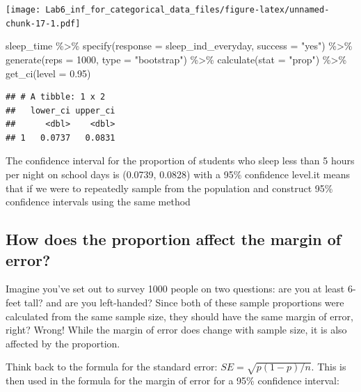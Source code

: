 \documentclass[
]{article}
\newenvironment{Shaded}{\begin{snugshade}}{\end{snugshade}}
\newcommand{\AttributeTok}[1]{\textcolor[rgb]{0.77,0.63,0.00}{#1}}
\newcommand{\DecValTok}[1]{\textcolor[rgb]{0.00,0.00,0.81}{#1}}
\newcommand{\FloatTok}[1]{\textcolor[rgb]{0.00,0.00,0.81}{#1}}
\newcommand{\FunctionTok}[1]{\textcolor[rgb]{0.00,0.00,0.00}{#1}}
\newcommand{\NormalTok}[1]{#1}
\newcommand{\SpecialCharTok}[1]{\textcolor[rgb]{0.00,0.00,0.00}{#1}}
\newcommand{\StringTok}[1]{\textcolor[rgb]{0.31,0.60,0.02}{#1}}
\begin{document}
\texttt{[image: Lab6\_inf\_for\_categorical\_data\_files/figure-latex/unnamed-chunk-17-1.pdf]}

\begin{Shaded}
\begin{Highlighting}[]
\NormalTok{sleep\_time }\SpecialCharTok{\%\textgreater{}\%}
 \FunctionTok{specify}\NormalTok{(}\AttributeTok{response =}\NormalTok{ sleep\_ind\_everyday, }\AttributeTok{success =} \StringTok{"yes"}\NormalTok{) }\SpecialCharTok{\%\textgreater{}\%}
 \FunctionTok{generate}\NormalTok{(}\AttributeTok{reps =} \DecValTok{1000}\NormalTok{, }\AttributeTok{type =} \StringTok{"bootstrap"}\NormalTok{) }\SpecialCharTok{\%\textgreater{}\%}
 \FunctionTok{calculate}\NormalTok{(}\AttributeTok{stat =} \StringTok{"prop"}\NormalTok{) }\SpecialCharTok{\%\textgreater{}\%}
 \FunctionTok{get\_ci}\NormalTok{(}\AttributeTok{level =} \FloatTok{0.95}\NormalTok{)}
\end{Highlighting}
\end{Shaded}

\begin{verbatim}
## # A tibble: 1 x 2
##   lower_ci upper_ci
##      <dbl>    <dbl>
## 1   0.0737   0.0831
\end{verbatim}

The confidence interval for the proportion of students who sleep less
than 5 hours per night on school days is (0.0739, 0.0828) with a 95\%
confidence level.it means that if we were to repeatedly sample from the
population and construct 95\% confidence intervals using the same method

\hypertarget{how-does-the-proportion-affect-the-margin-of-error}{%
\subsection{How does the proportion affect the margin of
error?}\label{how-does-the-proportion-affect-the-margin-of-error}}

Imagine you've set out to survey 1000 people on two questions: are you
at least 6-feet tall? and are you left-handed? Since both of these
sample proportions were calculated from the same sample size, they
should have the same margin of error, right? Wrong! While the margin of
error does change with sample size, it is also affected by the
proportion.

Think back to the formula for the standard error:
\(SE = \sqrt{p(1-p)/n}\). This is then used in the formula for the
margin of error for a 95\% confidence interval:
\end{document}
